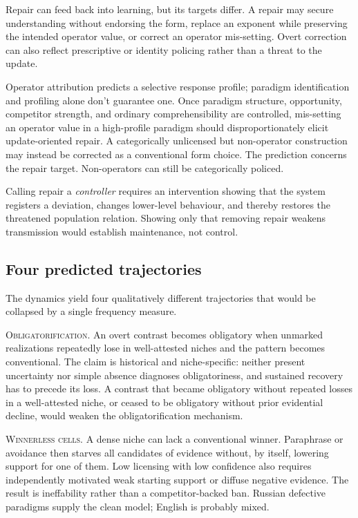Repair can feed back into learning, but its targets differ. A repair may secure
understanding without endorsing the form, replace an exponent while preserving
the intended operator value, or correct an operator mis-setting. Overt
correction can also reflect prescriptive or identity policing rather than a
threat to the update.

Operator attribution predicts a selective response profile; paradigm
identification and profiling alone don't guarantee one. Once paradigm
structure, opportunity, competitor strength, and ordinary comprehensibility are
controlled, mis-setting an operator value in a high-profile paradigm should
disproportionately elicit update-oriented
repair. A categorically unlicensed but non-operator construction may instead be
corrected as a conventional form choice. The prediction concerns the repair
target. Non-operators can still be categorically policed.

Calling repair a \emph{controller} requires an intervention showing that the
system registers a deviation, changes lower-level behaviour, and thereby
restores the threatened population relation. Showing only that removing repair
weakens transmission would establish maintenance, not control.

\subsection{Four predicted trajectories}

The dynamics yield four qualitatively different trajectories that would be
collapsed by a single frequency measure.

\noindent\textsc{Obligatorification.}
\label{sec:derived-obligatoriness}
An overt contrast becomes obligatory when unmarked realizations repeatedly lose
in well-attested niches and the pattern becomes conventional. The claim is
historical and niche-specific: neither present uncertainty nor simple absence
diagnoses obligatoriness, and sustained recovery has to precede its loss.
A contrast that became obligatory without repeated losses in a well-attested
niche, or ceased to be obligatory without prior evidential decline, would
weaken the obligatorification mechanism.

\noindent\textsc{Winnerless cells.}
\label{sec:winnerless-cells}
A dense niche can lack a conventional winner. Paraphrase or avoidance then
starves all candidates of evidence without, by itself, lowering support for one
of them. Low licensing with low confidence also requires independently
motivated weak starting support or diffuse negative evidence. The result is
ineffability rather than a competitor-backed ban. Russian defective paradigms
supply the clean model; English  is probably mixed.

